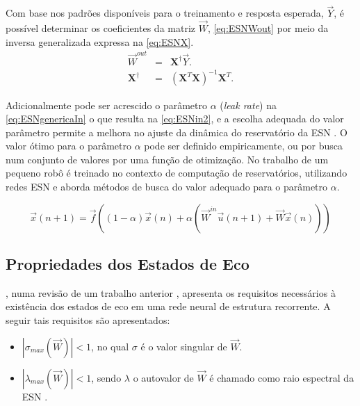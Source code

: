 Com base nos padrões disponíveis para o treinamento e resposta esperada, $\vec{Y}$, é possível determinar os coeficientes da matriz $\vec{W}$, \autoref{eq:ESNWout} por meio da inversa generalizada expressa na \autoref{eq:ESNX}.
\begin{eqnarray}
\vec{W}^{out} &=& \mathbf{X}^\dagger\vec{Y}.                      \label{eq:ESNWout}\\
\mathbf{X}^\dagger &=& (\mathbf{X}^T\mathbf{X})^{-1}\mathbf{X}^T. \label{eq:ESNX}
\end{eqnarray}

Adicionalmente pode ser acrescido o parâmetro $\alpha$ (\textit{leak rate}) na \autoref{eq:ESNgenericaIn} o que resulta na \autoref{eq:ESNin2}, e a escolha adequada do valor parâmetro permite a melhora no ajuste da dinâmica do reservatório da ESN \cite{thesis:simeon2015}. O valor ótimo para o parâmetro $\alpha$ pode ser definido empiricamente, ou por busca num conjunto de valores por uma função de otimização. No trabalho  de  um pequeno robô é treinado no contexto de computação de reservatórios, utilizando redes ESN e aborda métodos de busca do valor adequado para o parâmetro $\alpha$.

\begin{equation}
\vec{x}(n+1) =  \vec{f}((1-\alpha)\vec{x}(n) + \alpha(\vec{W}^{in}\vec{u}(n+1)+\vec{W}\vec{x}(n)))\label{eq:ESNin2}
\end{equation}


\subsection{Propriedades dos Estados de Eco}

, numa revisão de um trabalho anterior \cite{jaeger2001}, apresenta os requisitos necessários à existência dos estados de eco em uma rede neural de estrutura recorrente. A seguir tais requisitos são apresentados:

\begin{itemize}
	\item  $|\sigma_{max}(\vec{W})|<1$, no qual $\sigma$ é o valor singular de $\vec{W}$. 
	\item $|\lambda_{max}(\vec{W})| < 1$, sendo $\lambda$ o autovalor de $\vec{W}$ é chamado como raio espectral da ESN \cite{jaeger2010}.
\end{itemize} 


